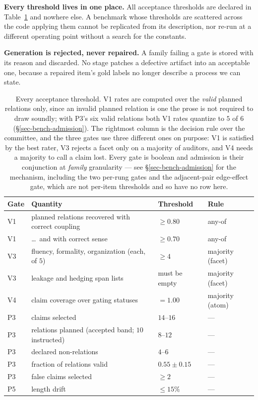 \textbf{Every threshold lives in one place.} All acceptance thresholds are declared in
Table~\ref{tab:thresholds} and nowhere else. A benchmark whose thresholds are scattered across the code
applying them cannot be replicated from its description, nor re-run at a different operating point
without a search for the constants.

\textbf{Generation is rejected, never repaired.} A family failing a gate is stored with its reason and
discarded. No stage patches a defective artifact into an acceptable one, because a repaired item's gold
labels no longer describe a process we can state.

\begin{table}[tbp]
\centering\small
\caption{Every acceptance threshold. V1 rates are computed over the \emph{valid} planned relations only,
  since an invalid planned relation is one the prose is not required to draw soundly; with P3's six valid
  relations both V1 rates quantize to $5$ of $6$ (\S\ref{sec-bench-admission}). The rightmost column is
  the decision rule over the committee, and the three gates use three different ones on purpose: V1 is
  satisfied by the best rater, V3 rejects a facet only on a majority of auditors, and V4 needs a majority
  to call a claim lost. Every gate is boolean and admission is their conjunction at \emph{family}
  granularity --- see \S\ref{sec-bench-admission} for the mechanism, including the two per-rung gates and
  the adjacent-pair edge-effect gate, which are not per-item thresholds and so have no row here.}
\label{tab:thresholds}
\begin{tabular}{@{}llll@{}}
\toprule
Gate & Quantity & Threshold & Rule \\
\midrule
V1 & planned relations recovered with correct coupling & $\ge 0.80$ & any-of \\
V1 & \dots\ and with correct sense & $\ge 0.70$ & any-of \\
V3 & fluency, formality, organization (each, of $5$) & $\ge 4$ & majority (facet) \\
V3 & leakage and hedging span lists & must be empty & majority (facet) \\
V4 & claim coverage over gating statuses & $=1.00$ & majority (atom) \\
\midrule
P3 & claims selected & $14$--$16$ & --- \\
P3 & relations planned (accepted band; $10$ instructed) & $8$--$12$ & --- \\
P3 & declared non-relations & $4$--$6$ & --- \\
P3 & fraction of relations valid & $0.55 \pm 0.15$ & --- \\
P3 & false claims selected & $\ge 2$ & --- \\
P5 & length drift & $\le 15\%$ & --- \\
\bottomrule
\end{tabular}
\end{table}

